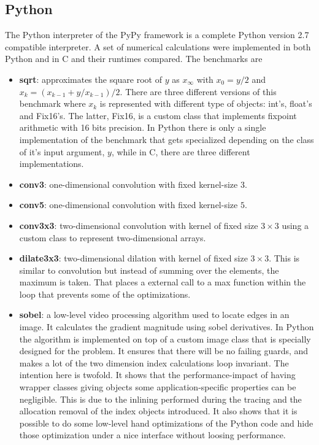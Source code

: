 \documentclass[preprint]{sigplanconf}
\begin{document}
\subsection{Python}
The Python interpreter of the PyPy framework is a complete Python
version 2.7 compatible interpreter. A set of numerical
calculations were implemented in both Python and in C and their
runtimes compared. The benchmarks are
\begin{itemize}
\item {\bf sqrt}: approximates the square root of $y$ as $x_\infty$
  with $x_0=y/2$ and $x_k = \left( x_{k-1} + y/x_{k-1} \right) /
  2$. There are three different versions of this benchmark where $x_k$
  is represented with different type of objects: int's, float's and
  Fix16's. The latter, Fix16, is a custom class that implements
  fixpoint arithmetic with 16 bits precision. In Python there is only
  a single implementation of the benchmark that gets specialized
  depending on the class of it's input argument, $y$, while in C,
  there are three different implementations.
\item {\bf conv3}: one-dimensional convolution with fixed kernel-size $3$.
\item {\bf conv5}: one-dimensional convolution with fixed kernel-size $5$.
\item {\bf conv3x3}: two-dimensional convolution with kernel of fixed
  size $3 \times 3$ using a custom class to represent two-dimensional
  arrays.
\item {\bf dilate3x3}: two-dimensional dilation with kernel of fixed
  size $3 \times 3$. This is similar to convolution but instead of
  summing over the elements, the maximum is taken. That places a
  external call to a max function within the loop that prevents some
  of the optimizations.
\item {\bf sobel}: a low-level video processing algorithm used to
  locate edges in an image. It calculates the gradient magnitude
  using sobel derivatives. In Python the algorithm is implemented
  on top of a custom image class that is specially designed for the
  problem. It ensures that there will be no failing guards, and makes
  a lot of the two dimension index calculations loop invariant. The
  intention here is twofold. It shows that the performance-impact of
  having wrapper classes giving objects some application-specific
  properties can be negligible. This is due to the inlining performed
  during the tracing and the allocation removal of the index objects
  introduced. It also shows that it is possible to do some low-level
  hand optimizations of the Python code and hide those optimization
  under a nice interface without loosing performance.
\end{itemize}
\end{document}

